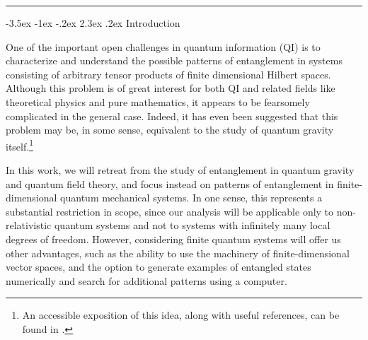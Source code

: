 \documentclass[12pt]{article}
\makeatletter
\renewcommand\section{\@startsection {section}{1}{\z@}%
                                   {-3.5ex \@plus -1ex \@minus -.2ex}%
                                   {2.3ex \@plus.2ex}%
                                   {\normalfont\large\bfseries}}
\numberwithin{equation}{section}
\makeatother
\begin{document}
\newpage
\renewcommand{\thefootnote}{\arabic{footnote}}
\setcounter{footnote}{0}


\tableofcontents{}
\vspace{1cm}
\bigskip\hrule




\allowdisplaybreaks



\section{Introduction}

One of the important open challenges in quantum information (QI) is to characterize and understand the possible patterns of entanglement in systems consisting of arbitrary tensor products of finite dimensional Hilbert spaces. Although this problem is of great interest for both QI and related fields like theoretical physics and pure mathematics, it appears to be fearsomely complicated in the general case. Indeed, it has even been suggested that this problem may be, in some sense, equivalent to the study of quantum gravity itself.\footnote{An accessible exposition of this idea, along with useful references, can be found in \cite{Wall:2023myf}.}


In this work, we will retreat from the study of entanglement in quantum gravity and quantum field theory, and focus instead on patterns of entanglement in finite-dimensional quantum mechanical systems. In one sense, this represents a substantial restriction in scope, since our analysis will be applicable only to non-relativistic quantum systems and not to systems with infinitely many local degrees of freedom. However, considering finite quantum systems will offer us other advantages, such as the ability to use the machinery of finite-dimensional vector spaces, and the option to generate examples of entangled states numerically and search for additional patterns using a computer.
\end{document}
